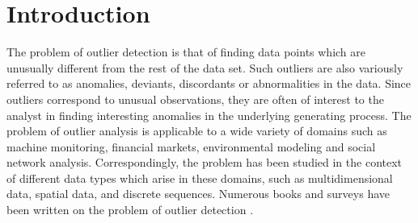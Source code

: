 \section{Introduction}
\label{sec:motivation}
 The problem of outlier detection is that of finding data points
 which are unusually different from the  rest of the data set.
 Such outliers are also variously referred to as anomalies, deviants,
 discordants or abnormalities in the data. Since outliers  correspond to
 unusual observations, they are often of interest to the analyst in
 finding interesting anomalies in the underlying generating process.
 \pagebreak
 The problem of
 outlier analysis is applicable to a wide variety of domains such as
 machine monitoring, financial markets, environmental modeling and
 social network analysis. 
Correspondingly, the problem has been studied in the context of
different data types which arise in these domains, such as
multidimensional data, spatial data, and discrete sequences.
Numerous books and surveys have been written on the problem
 of outlier detection \cite{outlierbook,chandola,chandola2,hawkins}.

